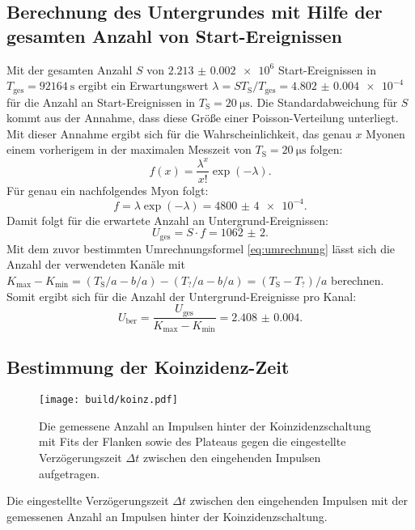 \subsection{Berechnung des Untergrundes mit Hilfe der gesamten Anzahl von Start-Ereignissen}
\label{subsec:Berechnung}
Mit der gesamten Anzahl $S$ von $\num{2.213(2)e6}$ Start-Ereignissen in $T_\text{ges}=\SI{92164}{\second}$ ergibt ein Erwartungswert $\lambda=S T_\text{S}/T_\text{ges}=\num{4.802(4)e-4}$ für die Anzahl an Start-Ereignissen in $T_\text{S}=\SI{20}{\micro\second}$. Die Standardabweichung für $S$ kommt aus der Annahme, dass diese Größe einer Poisson-Verteilung unterliegt. Mit dieser Annahme ergibt sich für die Wahrscheinlichkeit, das genau $x$ Myonen einem vorherigem in der maximalen Messzeit von $T_\text{S}=\SI{20}{\micro\second}$ folgen: 
\begin{displaymath}
f(x)=\frac{\lambda^x}{x!}\exp(-\lambda).
\end{displaymath}
Für genau ein nachfolgendes Myon folgt:
\begin{displaymath}
f=\lambda\exp(-\lambda)=\num{4800(4)e-4}.
\end{displaymath}
Damit folgt für die erwartete Anzahl an Untergrund-Ereignissen:
\begin{displaymath}
U_\text{ges}=S \cdot f =\num{1062(2)}.
\end{displaymath}
Mit dem zuvor bestimmten Umrechnungsformel \eqref{eq:umrechnung} lässt sich die Anzahl der verwendeten Kanäle mit $K_\text{max}-K_\text{min}=(T_\text{S}/a -b/a)-(T_\text{?}/a-b/a)= (T_\text{S}-T_\text{?})/a$ berechnen.
Somit ergibt sich für die Anzahl der Untergrund-Ereignisse pro Kanal:
\begin{displaymath}
U_\text{ber}=\frac{U_\text{ges}}{K_\text{max}-K_\text{min}} =\num{2.408(4)}.
\end{displaymath}

\subsection{Bestimmung der Koinzidenz-Zeit}
\label{subsec:Koinzidenz}
\begin{figure}
	\centering
	\texttt{[image: build/koinz.pdf]}
	\caption{Die gemessene Anzahl an Impulsen hinter der Koinzidenzschaltung mit Fits der Flanken sowie des Plateaus gegen die eingestellte Verzögerungszeit $\varDelta t$ zwischen den eingehenden Impulsen aufgetragen.}
	\label{fig:zweite}
\end{figure}
\begin{table}
	\centering
	\caption{Die eingestellte Verzögerungszeit $\varDelta t$ zwischen den eingehenden Impulsen mit der gemessenen Anzahl an Impulsen hinter der Koinzidenzschaltung.}
	
\end{table}

